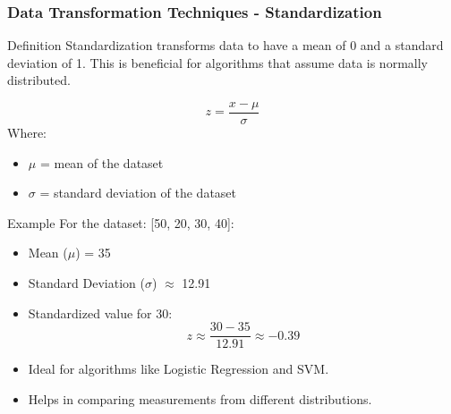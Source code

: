\documentclass[aspectratio=169]{beamer}
\begin{document}
\begin{frame}[fragile]
    \frametitle{Data Transformation Techniques - Standardization}
    \begin{block}{Definition}
        Standardization transforms data to have a mean of 0 and a standard deviation of 1. This is beneficial for algorithms that assume data is normally distributed.
    \end{block}
    
    \begin{equation}
        z = \frac{x - \mu}{\sigma}
    \end{equation}
    Where:
    \begin{itemize}
        \item $\mu$ = mean of the dataset
        \item $\sigma$ = standard deviation of the dataset
    \end{itemize}
    
    \begin{block}{Example}
        For the dataset: [50, 20, 30, 40]:
        \begin{itemize}
            \item Mean ($\mu$) = 35
            \item Standard Deviation ($\sigma$) $\approx$ 12.91
            \item Standardized value for 30:
            \begin{equation}
                z \approx \frac{30 - 35}{12.91} \approx -0.39
            \end{equation}
        \end{itemize}
    \end{block}

    \begin{itemize}
        \item Ideal for algorithms like Logistic Regression and SVM.
        \item Helps in comparing measurements from different distributions.
    \end{itemize}
\end{frame}
\end{document}
